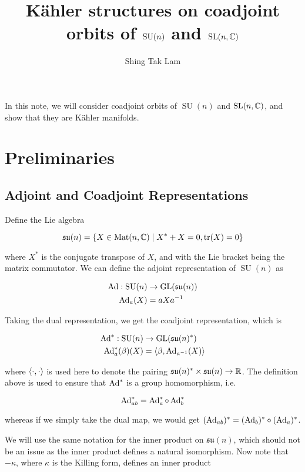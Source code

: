 \documentclass{report}
\title{K\"ahler structures on coadjoint orbits of \(\SU(n)\) and \(\operatorname{SL}(n, \mathbb{C})\)}
\author{Shing Tak Lam}
\DeclareMathOperator{\SU}{SU}
\newcommand{\su}{\mathfrak{su}}
\begin{document}
\maketitle

In this note, we will consider coadjoint orbits of \(\SU(n)\) and \(\operatorname{SL}(n, \mathbb{C})\), and show that they are K\"ahler manifolds.

\tableofcontents

\chapter{Preliminaries}

\section{Adjoint and Coadjoint Representations}

\label{sec:adjoint}

Define the Lie algebra

\begin{equation}
    \label{eq:sun-def}
    \su(n) = \left\{X \in \Mat(n, \C) \mid X^* + X = 0, \tr(X) = 0\right\}
\end{equation}

where \(X^*\) is the conjugate transpose of \(X\), and with the Lie bracket being the matrix commutator. We can define the adjoint representation of \(\SU(n)\) as

\begin{align*}
    \Ad : \SU(n) &\to \GL(\su(n)) \\
    \Ad_a(X) &= aXa^{-1}
\end{align*}

Taking the dual representation, we get the coadjoint representation, which is

\begin{align*}
    \Ad^* : \SU(n) &\to \GL(\su(n)^*) \\
    \Ad^*_a(\beta)(X) &= \inner{\beta, \Ad_{a^{-1}}(X)}
\end{align*}

where \(\left\langle \cdot, \cdot \right\rangle\) is used here to denote the pairing \(\su(n)^* \times \su(n) \to \R\). The definition above is used to ensure that \(\operatorname{Ad}^*\) is a group homomorphism, i.e.

\[\operatorname{Ad}^*_{ab} = \operatorname{Ad}_a^* \circ \operatorname{Ad}_b^*\]

whereas if we simply take the dual map, we would get \((\operatorname{Ad}_{ab})^* = (\operatorname{Ad}_b)^* \circ (\operatorname{Ad}_a)^*\).

We will use the same notation for the inner product on \(\su(n)\), which should not be an issue as the inner product defines a natural isomorphism. Now note that \(-\kappa\), where \(\kappa\) is the Killing form, defines an inner product
\end{document}

